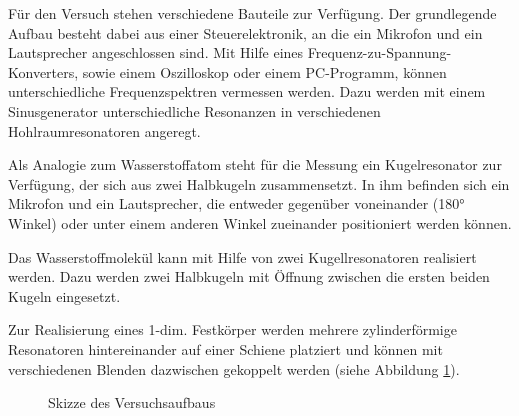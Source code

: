 Für den Versuch stehen verschiedene Bauteile zur Verfügung. Der grundlegende Aufbau besteht dabei aus einer Steuerelektronik,
an die ein Mikrofon und ein Lautsprecher angeschlossen sind. Mit Hilfe eines Frequenz-zu-Spannung-Konverters, sowie einem
Oszilloskop oder einem PC-Programm, können unterschiedliche Frequenzspektren vermessen werden. Dazu werden mit einem
Sinusgenerator unterschiedliche Resonanzen in verschiedenen Hohlraumresonatoren angeregt.

Als Analogie zum Wasserstoffatom steht für die Messung ein Kugelresonator zur Verfügung, der sich aus zwei Halbkugeln
zusammensetzt. In ihm befinden sich ein Mikrofon und ein Lautsprecher, die entweder gegenüber voneinander (180° Winkel)
oder unter einem anderen Winkel zueinander positioniert werden können.

Das Wasserstoffmolekül kann mit Hilfe von zwei Kugellresonatoren realisiert werden. Dazu werden zwei Halbkugeln mit Öffnung
zwischen die ersten beiden Kugeln eingesetzt.

Zur Realisierung eines 1-dim. Festkörper werden mehrere zylinderförmige Resonatoren hintereinander auf einer Schiene platziert
und können mit verschiedenen Blenden dazwischen gekoppelt werden (siehe Abbildung \ref{fig:aufbau}).

\begin{figure}[H]
  \centering
  \caption{Skizze des Versuchsaufbaus}
  \label{fig:aufbau}
\end{figure}
